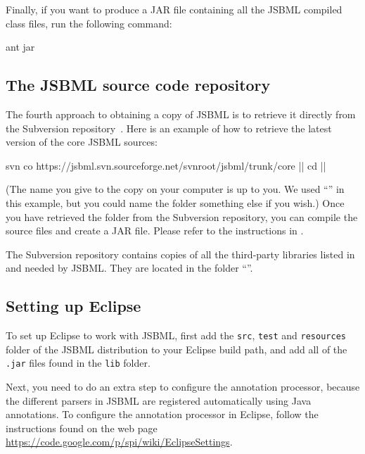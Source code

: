 Finally, if you want to produce a JAR file containing all the JSBML
compiled class files, run the following command:

\begin{example}[style=bash, title={Creating a JAR file.}]
ant jar
\end{example}



\subsection{The JSBML source code repository}
\label{sec:SourceDistribution}

The fourth approach to obtaining a copy of JSBML is to retrieve it directly
from the Subversion repository~\cite{JSBMLSVN}.  Here is an example of how
to retrieve the latest version of the core JSBML sources:

\newcommand{\dirname}{\code{\emph{\color{winered}jsbml}}\xspace}

\begin{example}[style=bash, title={Downloading the latest JSBML 
    sources from the JSBML project's Subversion repository.}]
svn co https://jsbml.svn.sourceforge.net/svnroot/jsbml/trunk/core |\dirname|
cd |\dirname|
\end{example}

(The name you give to the copy on your computer is up to you.  We used
``\dirname'' in this example, but you could name the folder something else
if you wish.)  Once you have retrieved the folder from the Subversion
repository, you can compile the source files and create a JAR file.  Please
refer to the instructions in .

The Subversion repository contains copies of all the third-party libraries
listed in  and needed by JSBML.  They are
located in the folder ``\dirname{}''.


\subsection{Setting up Eclipse}
\label{sec:SettingUpEclipse}

To set up Eclipse to work with JSBML, first add the \texttt{src},
\texttt{test} and \texttt{resources} folder of the JSBML distribution to your
Eclipse build path, and add all of the \texttt{.jar} files found in the
\texttt{lib} folder.

Next, you need to do an extra step to configure the annotation processor,
because the different parsers in JSBML are registered automatically using
Java annotations.  To configure the annotation processor in Eclipse, follow
the instructions found on the web page
\url{https://code.google.com/p/spi/wiki/EclipseSettings}.

